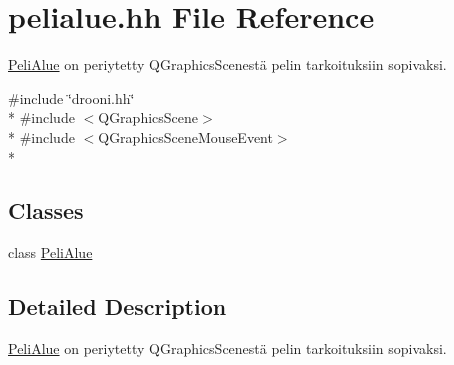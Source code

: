 \hypertarget{pelialue_8hh}{\section{pelialue.\-hh File Reference}
\label{pelialue_8hh}
}


\hyperlink{class_peli_alue}{Peli\-Alue} on periytetty Q\-Graphics\-Scenestä pelin tarkoituksiin sopivaksi.  


{\ttfamily \#include \char`\"{}drooni.\-hh\char`\"{}}\\*
{\ttfamily \#include $<$Q\-Graphics\-Scene$>$}\\*
{\ttfamily \#include $<$Q\-Graphics\-Scene\-Mouse\-Event$>$}\\*
\subsection*{Classes}
\begin{DoxyCompactItemize}
\item 
class \hyperlink{class_peli_alue}{Peli\-Alue}
\end{DoxyCompactItemize}


\subsection{Detailed Description}
\hyperlink{class_peli_alue}{Peli\-Alue} on periytetty Q\-Graphics\-Scenestä pelin tarkoituksiin sopivaksi. 